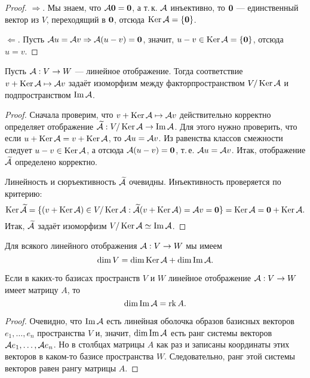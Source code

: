 \begin{proof}
    $\Rightarrow$. Мы знаем, что $\mathcal{A}\boldsymbol{0} = \boldsymbol{0}$, а т.\,к. $\mathcal{A}$ инъективно, то $\boldsymbol{0}$ --- единственный вектор из $V$, переходящий в $\boldsymbol{0}$, отсюда $\operatorname{Ker}\mathcal{A} = \{\boldsymbol{0}\}$.

    $\Leftarrow$. Пусть $\mathcal{A} u = \mathcal{A} v \Rightarrow \mathcal{A}(u - v) = \boldsymbol{0}$, значит, $u - v \in \operatorname{Ker}\mathcal{A} = \{\boldsymbol{0}\}$, отсюда $u = v$.
\end{proof}

\begin{theorem}
    Пусть $\mathcal{A}: V \to W$ --- линейное отображение. Тогда соответствие $v + \operatorname{Ker}\mathcal{A} \mapsto \mathcal{A} v$ задаёт изоморфизм между факторпространством $V / \operatorname{Ker}\mathcal{A}$ и подпространством $\operatorname{Im}\mathcal{A}$.
\end{theorem}

\begin{proof}
    Сначала проверим, что $v + \operatorname{Ker}\mathcal{A} \mapsto \mathcal{A} v$ действительно корректно определяет отображение $\widetilde{\mathcal{A}}: V / \operatorname{Ker}\mathcal{A} \to \operatorname{Im}\mathcal{A}$. Для этого нужно проверить, что если $u + \operatorname{Ker}\mathcal{A} = v + \operatorname{Ker}\mathcal{A}$, то $\mathcal{A} u = \mathcal{A} v$. Из равенства классов смежности следует $u - v \in \operatorname{Ker}\mathcal{A}$, а отсюда $\mathcal{A}(u - v) = \boldsymbol{0}$, т.\,е. $\mathcal{A} u = \mathcal{A} v$. Итак, отображение $\widetilde{\mathcal{A}}$ определено корректно.

    Линейность и сюръективность $\widetilde{\mathcal{A}}$ очевидны. Инъективность проверяется по критерию: \[\operatorname{Ker}\widetilde{\mathcal{A}} = \{(v + \operatorname{Ker}\mathcal{A}) \in V / \operatorname{Ker}\mathcal{A} : \widetilde{\mathcal{A}}(v + \operatorname{Ker}\mathcal{A}) = \mathcal{A} v = \boldsymbol{0}\} = \operatorname{Ker}\mathcal{A} = \boldsymbol{0} + \operatorname{Ker}\mathcal{A}.\] Итак, $\widetilde{\mathcal{A}}$ задаёт изоморфизм $V / \operatorname{Ker}\mathcal{A} \simeq \operatorname{Im}\mathcal{A}$.
\end{proof}

\begin{corollary}
    Для всякого линейного отображения $\mathcal{A}: V \to W$ мы имеем \[\dim V = \dim\operatorname{Ker}\mathcal{A} + \dim\operatorname{Im}\mathcal{A}.\]
\end{corollary}

\begin{proposal}
    Если в каких-то базисах пространств $V$ и $W$ линейное отображение $\mathcal{A}: V \to W$ имеет матрицу $A$, то
    \[
        \dim\operatorname{Im}\mathcal{A} = \operatorname{rk} A.
    \]
\end{proposal}

\begin{proof}
    Очевидно, что $\operatorname{Im}\mathcal{A}$ есть линейная оболочка образов базисных векторов $e_1, \ldots, e_n$ пространства $V$ и, значит, $\dim\operatorname{Im}\mathcal{A}$ есть ранг системы векторов $\mathcal{A} e_1, \ldots, \mathcal{A} e_n$. Но в столбцах матрицы $A$ как раз и записаны координаты этих векторов в каком-то базисе пространства $W$. Следовательно, ранг этой системы векторов равен рангу матрицы $A$.
\end{proof}

